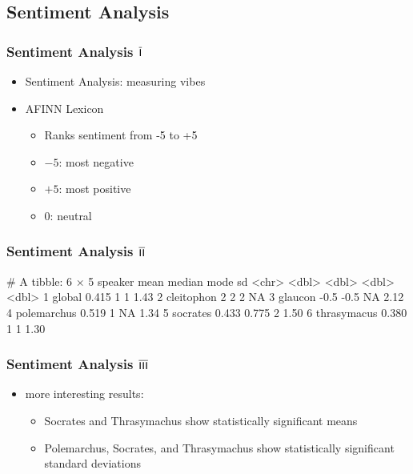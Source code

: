 \documentclass{beamer}
\renewcommand{\Roman}[1]{$\overline{\textsf{\small{\MakeUppercase{\romannumeral #1}}}}$}
\begin{document}
\subsection{Sentiment Analysis}  %

\begin{frame}
\frametitle{Sentiment Analysis \Roman{1}}
\begin{itemize}
\item Sentiment Analysis: measuring vibes
\item AFINN Lexicon
  \begin{itemize}
  \item Ranks sentiment from -5 to +5
  \item $-5$: most negative
  \item $+5$: most positive
  \item $0$: neutral
  \end{itemize}
\end{itemize}
\end{frame}



\begin{frame}[fragile]
\frametitle{Sentiment Analysis \Roman{2}}
\begin{Schunk}
\begin{Soutput}
# A tibble: 6 × 5
  speaker       mean median  mode    sd
  <chr>        <dbl>  <dbl> <dbl> <dbl>
1 global       0.415  1         1  1.43
2 cleitophon   2      2         2 NA   
3 glaucon     -0.5   -0.5      NA  2.12
4 polemarchus  0.519  1        NA  1.34
5 socrates     0.433  0.775     2  1.50
6 thrasymacus  0.380  1         1  1.30
\end{Soutput}
\end{Schunk}
\end{frame}



\begin{frame}
\frametitle{Sentiment Analysis \Roman{3}}
\begin{itemize}
\item more interesting results:
  \begin{itemize}
    \item Socrates and Thrasymachus show statistically significant means
    \item Polemarchus, Socrates, and Thrasymachus show statistically significant standard deviations
  \end{itemize}
\end{itemize}
\end{frame}
\end{document}
